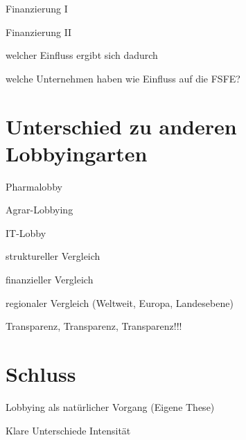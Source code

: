 \begin{itemize*}
\item Finanzierung I
\item Finanzierung II
\item welcher Einfluss ergibt sich dadurch
\item welche Unternehmen haben wie Einfluss auf die FSFE?
\end{itemize*}

\section{Unterschied zu anderen Lobbyingarten}
\begin{itemize*}
\item Pharmalobby \cite{BeckLobbyGesundwe}
\item Agrar-Lobbying
\item IT-Lobby
\item struktureller Vergleich
\item finanzieller Vergleich
\item regionaler Vergleich (Weltweit, Europa, Landesebene)
\item Transparenz, Transparenz, Transparenz!!!
\end{itemize*}

\section{Schluss}
\begin{itemize*}
\item Lobbying als natürlicher Vorgang (Eigene These)
\item Klare Unterschiede Intensität
\end{itemize*}

\newpage



\listoftodos



